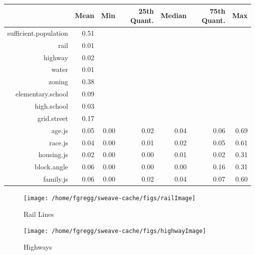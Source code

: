 \documentclass[12pt,letter]{article}\usepackage[]{graphicx}\usepackage[]{color}
\newenvironment{knitrout}{}{} %
\begin{document}
\begin{table}[ht]
\centering
\begin{tabular}{rrrrrrr}
  \hline
 & Mean & Min & 25th Quant. & Median & 75th Quant. & Max \\ 
  \hline
sufficient.population & 0.51 &  &  &  &  &  \\ 
  rail & 0.01 &  &  &  &  &  \\ 
  highway & 0.02 &  &  &  &  &  \\ 
  water & 0.01 &  &  &  &  &  \\ 
  zoning & 0.38 &  &  &  &  &  \\ 
  elementary.school & 0.09 &  &  &  &  &  \\ 
  high.school & 0.03 &  &  &  &  &  \\ 
  grid.street & 0.17 &  &  &  &  &  \\ 
  age.js & 0.05 & 0.00 & 0.02 & 0.04 & 0.06 & 0.69 \\ 
  race.js & 0.04 & 0.00 & 0.01 & 0.02 & 0.05 & 0.61 \\ 
  housing.js & 0.02 & 0.00 & 0.00 & 0.01 & 0.02 & 0.31 \\ 
  block.angle & 0.06 & 0.00 & 0.00 & 0.00 & 0.16 & 0.31 \\ 
  family.js & 0.06 & 0.00 & 0.02 & 0.04 & 0.07 & 0.60 \\ 
   \hline
\end{tabular}
\end{table}



\begin{figure}
\begin{knitrout}
\color{fgcolor}

{\centering \texttt{[image: /home/fgregg/sweave-cache/figs/railImage]} 

}



\end{knitrout}

\caption{Rail Lines}
\end{figure}

\begin{figure}
\begin{knitrout}
\color{fgcolor}

{\centering \texttt{[image: /home/fgregg/sweave-cache/figs/highwayImage]} 

}



\end{knitrout}

\caption{Highways}
\end{figure}
\end{document}
